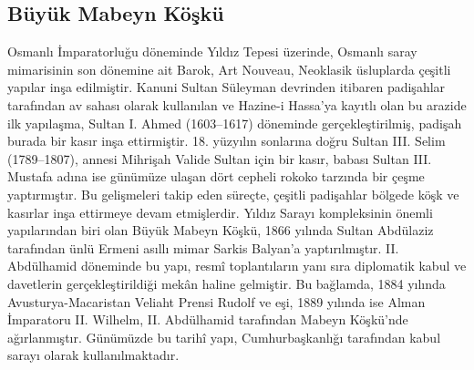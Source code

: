 \subsection{Büyük Mabeyn Köşkü}
\indent\indent Osmanlı İmparatorluğu döneminde Yıldız Tepesi üzerinde, Osmanlı saray mimarisinin son dönemine ait Barok, Art Nouveau, Neoklasik üsluplarda çeşitli yapılar inşa edilmiştir. Kanuni Sultan Süleyman devrinden itibaren padişahlar tarafından av sahası olarak kullanılan ve Hazine-i Hassa’ya kayıtlı olan bu arazide ilk yapılaşma, Sultan I. Ahmed (1603–1617) döneminde gerçekleştirilmiş, padişah burada bir kasır inşa ettirmiştir. 18. yüzyılın sonlarına doğru Sultan III. Selim (1789–1807), annesi Mihrişah Valide Sultan için bir kasır, babası Sultan III. Mustafa adına ise günümüze ulaşan dört cepheli rokoko tarzında bir çeşme yaptırmıştır. Bu gelişmeleri takip eden süreçte, çeşitli padişahlar bölgede köşk ve kasırlar inşa ettirmeye devam etmişlerdir.\newline
\indent Yıldız Sarayı kompleksinin önemli yapılarından biri olan Büyük Mabeyn Köşkü, 1866 yılında Sultan Abdülaziz tarafından ünlü Ermeni asıllı mimar Sarkis Balyan’a yaptırılmıştır. II. Abdülhamid döneminde bu yapı, resmî toplantıların yanı sıra diplomatik kabul ve davetlerin gerçekleştirildiği mekân haline gelmiştir. Bu bağlamda, 1884 yılında Avusturya-Macaristan Veliaht Prensi Rudolf ve eşi, 1889 yılında ise Alman İmparatoru II. Wilhelm, II. Abdülhamid tarafından Mabeyn Köşkü’nde ağırlanmıştır. Günümüzde bu tarihî yapı, Cumhurbaşkanlığı tarafından kabul sarayı olarak kullanılmaktadır.\cite{dia_7}